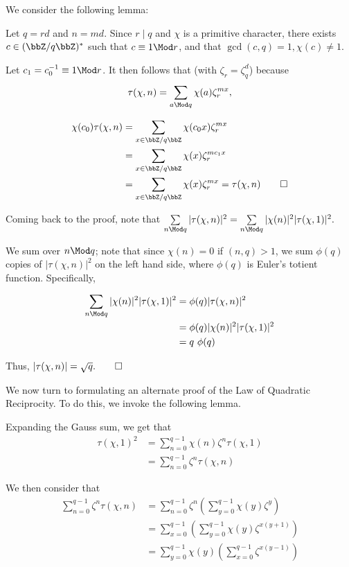 \documentclass[a4paper, 12pt,oneside,openany]{book}
\begin{document}
We consider the following lemma:


 Let $q=rd$ and $n=md$. Since $r \mid q$ and $\chi$ is a primitive character, there exists $c \in (\bbZ/q\bbZ)^*$ such that $c \equiv1 \Mod r$, and that $\gcd(c, q)=1, \chi(c) \neq 1.$ 

Let $c_1 = c_0^{-1}\equiv 1 \Mod r$. It then follows that (with $\zeta_r=\zeta_q^d$) because $$\tau(\chi, n) = \sum\limits_{a \Mod q} \chi(a)\zeta_r^{mx},$$ 

\begin{align*}
	\chi(c_0)\tau(\chi, n) &= \sum\limits_{x \in \bbZ/q\bbZ} \chi(c_0 x) \zeta_r^{mx} \\ &= \sum\limits_{x \in \bbZ/q\bbZ}\chi(x) \zeta_r^{mc_1x} \\ &= \sum\limits_{x \in \bbZ/q\bbZ}\chi(x) \zeta_r^{mx} = \tau(\chi, n) \qed
\end{align*}

Coming back to the proof, note that $\sum\limits_{n \Mod q} |\tau(\chi, n)|^2 = \sum\limits_{n \Mod q} |\chi(n)|^2 |\tau(\chi, 1)|^2.$ 

We sum over $n \Mod q$; note that since $\chi(n)=0$ if $(n, q)>1$, we sum $\phi(q)$ copies of $|\tau(\chi, n)|^2$ on the left hand side, where $\phi(q)$ is Euler's totient function. Specifically,

\begin{align*}
	 \sum\limits_{n \Mod q} |\chi(n)|^2 |\tau(\chi, 1)|^2 &= \phi(q) |\tau(\chi, n)|^2 \\ &= \phi(q) |\chi(n)|^2|\tau(\chi, 1)|^2 \\ &= q\ \phi(q)
\end{align*}

Thus, $|\tau(\chi, n)| = \sqrt{q}. \qed$

We now turn to formulating an alternate proof of the Law of Quadratic Reciprocity. To do this, we invoke the following lemma.


 Expanding the Gauss sum, we get that \begin{align*} \tau(\chi, 1)^2 &= \sum\limits_{n=0}^{q-1} \chi(n) \zeta^n \tau(\chi, 1) \\ &= \sum\limits_{n=0}^{q-1} \zeta^n \tau(\chi, n) \end{align*}

We then consider that \begin{align*} \sum\limits_{n=0}^{q-1} \zeta^n \tau(\chi, n) &= \sum\limits_{n=0}^{q-1} \zeta^n \left(\sum\limits_{y=0}^{q-1} \chi(y) \zeta^y \right) \\ &= \sum\limits_{x=0}^{q-1}\left(\sum\limits_{y=0}^{q-1} \chi(y) \zeta^{x(y+1)} \right) \\ &= \sum\limits_{y=0}^{q-1} \chi(y) \left( \sum\limits_{x=0}^{q-1} \zeta^{x(y-1)} \right) \end{align*}
\end{document}
